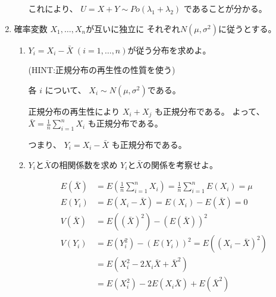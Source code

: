 \documentclass[12pt,b5paper]{ltjsarticle}
\begin{document}
\begin{enumerate}
\begin{enumerate}
            これにより、
            $U=X+Y \sim Po(\lambda_{1}+\lambda_{2})$
            であることが分かる。



            \hrulefill

      \end{enumerate}

 \item
      確率変数 $X_{1},\dots,X_{n}$が互いに独立に
      それぞれ$N(\mu,\sigma^{2})$に従うとする。
      \begin{enumerate}
       \item
            $Y_{i}=X_{i}-\bar{X} \;(i=1,\dots,n)$が従う分布を求めよ。

            (HINT:正規分布の再生性の性質を使う)

            \dotfill

            各 $i$ について、
            $X_{i} \sim N(\mu,\sigma^{2})$である。

            正規分布の再生性により
            $X_{i}+X_{j}$
            も正規分布である。
            よって、
            $\bar{X} = \frac{1}{n}\sum_{i=1}^{n}X_{i}$
            も正規分布である。

            つまり、
            $Y_{i} = X_{i}-\bar{X}$
            も正規分布である。

            \hrulefill


       \item
            $Y_{i}$と$\bar{X}$の相関係数を求め
            $Y_{i}$と$\bar{X}$の関係を考察せよ。

            \dotfill

            \begin{align}
             E(\bar{X})
             &=E\left( \frac{1}{n}\sum_{i=1}^{n}X_{i} \right)
              = \frac{1}{n}\sum_{i=1}^{n}E(X_{i})
              =\mu\\
             E(Y_{i})
             &= E(X_{i}-\bar{X})
             = E(X_{i})-E(\bar{X})
             =0\\
             V(\bar{X})
             &= E((\bar{X})^{2}) - (E(\bar{X}))^{2}
             \\
             V(Y_{i})
             &= E(Y_{i}^{2}) - (E(Y_{i}))^{2}
             = E((X_{i}-\bar{X})^{2})\\
             &= E(X_{i}^{2}-2X_{i}\bar{X}+\bar{X}^{2})\\
             &= E(X_{i}^{2})-2E(X_{i}\bar{X})+E(\bar{X}^{2})
            \end{align}


\end{enumerate}
\end{enumerate}
\end{document}

